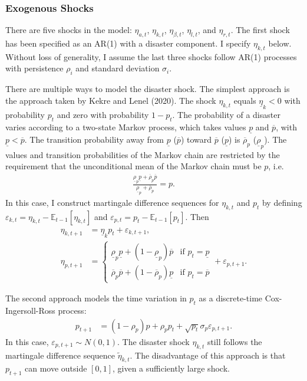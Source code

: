 \documentclass[12 pt, oneside]{article}
\theoremstyle{definition}
\theoremstyle{definition}
\theoremstyle{definition}
\newcommand{\E}{\mathbb{E}}
\begin{document}
\subsubsection{Exogenous Shocks}\label{sec:exog shocks}
There are five shocks in the model: $\eta_{a, t}$, $\eta_{k, t}$, $\eta_{\beta, t}$, $\eta_{l, t}$, and $\eta_{r, t}$. The first shock has been specified as an AR(1) with a disaster component. I specify $\eta_{k, t}$ below. Without loss of generality, I assume the last three shocks follow AR(1) processes with persistence $\rho_i$ and standard deviation $\sigma_i$.

There are multiple ways to model the disaster shock. The simplest approach is the approach taken by Kekre and Lenel (2020). The shock $\eta_{k, t}$ equals $\underline{\eta}_k < 0$ with probability $p_t$ and zero with probability $1 - p_t$. The probability of a disaster varies according to a two-state Markov process, which takes values $\underline{p}$ and $\overline{p}$, with $\underline{p} < \overline{p}$. The transition probability away from $\underline{p}$ ($\overline{p}$) toward $\overline{p}$ ($\underline{p}$) is $\overline{\rho}_p$ ($\underline{\rho}_p$). The values and transition probabilities of the Markov chain are restricted by the requirement that the unconditional mean of the Markov chain must be $p$, i.e.
\begin{align*}
  \frac{\underline{\rho}_p\underline{p} + \overline{\rho}_p \overline{p}}{\underline{\rho}_p + \overline{\rho}_p} = p.
\end{align*}
In this case, I construct martingale difference sequences for $\eta_{k, t}$ and $p_t$ by defining $\varepsilon_{k, t} = \eta_{k, t} - \E_{t - 1}[\eta_{k, t}]$ and $\varepsilon_{p, t} = p_t - \E_{t- 1}[p_t]$. Then
\begin{align}
  \eta_{k, t + 1} & = \underline{\eta}_k p_t + \varepsilon_{k, t + 1},\\
  \eta_{p, t + 1} & = \begin{cases}
    \underline{\rho}_p \underline{p} + (1 - \underline{\rho}_p) \overline{p} & \text{if } p_t = \underline{p}\\
    \overline{\rho}_p \overline{p} + (1 - \overline{\rho}_p) \underline{p} & \text{if } p_t = \overline{p}
  \end{cases} + \varepsilon_{p, t + 1}.
\end{align}

The second approach models the time variation in $p_t$ as a discrete-time Cox-Ingersoll-Ross process:
\begin{align}
  p_{t + 1} & = (1 - \rho_p) p + \rho_p p_t + \sqrt{p_t}\sigma_p \varepsilon_{p, t + 1}.
\end{align}
In this case, $\varepsilon_{p, t + 1} \sim N(0, 1)$. The disaster shock $\eta_{k, t}$ still follows the martingale difference sequence $\tilde{\eta}_{k, t}$. The disadvantage of this approach is that $p_{t + 1}$ can move outside $[0, 1]$, given a sufficiently large shock.
\end{document}
